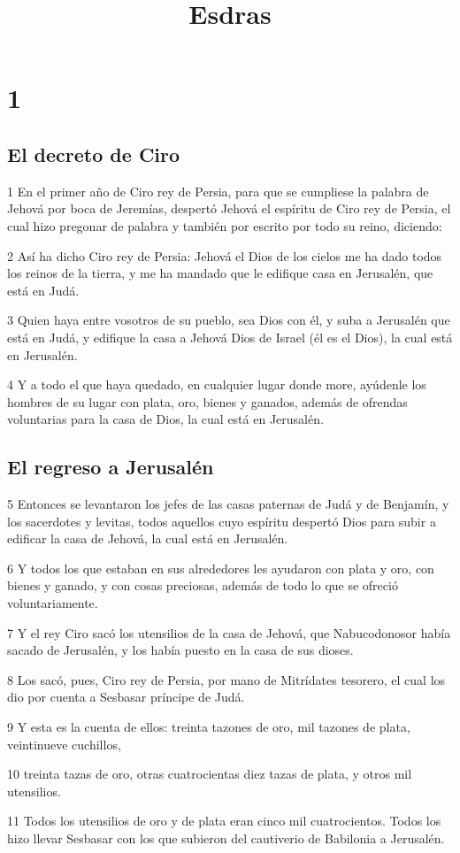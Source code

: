 

\title{Esdras}

\chapter{1}

\section*{El decreto de Ciro}

\par 1 En el primer año de Ciro rey de Persia, para que se cumpliese la palabra de Jehová por boca de Jeremías, despertó Jehová el espíritu de Ciro rey de Persia, el cual hizo pregonar de palabra y también por escrito por todo su reino, diciendo:
\par 2 Así ha dicho Ciro rey de Persia: Jehová el Dios de los cielos me ha dado todos los reinos de la tierra, y me ha mandado que le edifique casa en Jerusalén, que está en Judá.
\par 3 Quien haya entre vosotros de su pueblo, sea Dios con él, y suba a Jerusalén que está en Judá, y edifique la casa a Jehová Dios de Israel (él es el Dios), la cual está en Jerusalén.
\par 4 Y a todo el que haya quedado, en cualquier lugar donde more, ayúdenle los hombres de su lugar con plata, oro, bienes y ganados, además de ofrendas voluntarias para la casa de Dios, la cual está en Jerusalén.

\section*{El regreso a Jerusalén}

\par 5 Entonces se levantaron los jefes de las casas paternas de Judá y de Benjamín, y los sacerdotes y levitas, todos aquellos cuyo espíritu despertó Dios para subir a edificar la casa de Jehová, la cual está en Jerusalén.
\par 6 Y todos los que estaban en sus alrededores les ayudaron con plata y oro, con bienes y ganado, y con cosas preciosas, además de todo lo que se ofreció voluntariamente.
\par 7 Y el rey Ciro sacó los utensilios de la casa de Jehová, que Nabucodonosor había sacado de Jerusalén, y los había puesto en la casa de sus dioses.
\par 8 Los sacó, pues, Ciro rey de Persia, por mano de Mitrídates tesorero, el cual los dio por cuenta a Sesbasar príncipe de Judá.
\par 9 Y esta es la cuenta de ellos: treinta tazones de oro, mil tazones de plata, veintinueve cuchillos,
\par 10 treinta tazas de oro, otras cuatrocientas diez tazas de plata, y otros mil utensilios.
\par 11 Todos los utensilios de oro y de plata eran cinco mil cuatrocientos. Todos los hizo llevar Sesbasar con los que subieron del cautiverio de Babilonia a Jerusalén.

